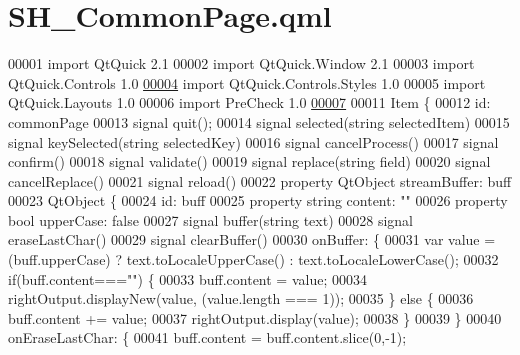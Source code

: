 \hypertarget{SH__CommonPage_8qml}{\section{S\-H\-\_\-\-Common\-Page.\-qml}
\label{SH__CommonPage_8qml}
}

\begin{DoxyCode}
00001 \textcolor{keyword}{import} QtQuick 2.1
00002 import QtQuick.Window 2.1
00003 import QtQuick.Controls 1.0
\hypertarget{SH__CommonPage_8qml_source_l00004}{}\hyperlink{classSH__CommonPage}{00004} import QtQuick.Controls.Styles 1.0
00005 import QtQuick.Layouts 1.0
00006 import PreCheck 1.0
\hypertarget{SH__CommonPage_8qml_source_l00007}{}\hyperlink{classSH__CommonPage_af59ae18e73706e3622c000c2005d9550}{00007} 
00011 Item \{
00012     \textcolor{keywordtype}{id}: commonPage
00013     signal quit();
00014     signal selected(\textcolor{keywordtype}{string} selectedItem)
00015     signal keySelected(\textcolor{keywordtype}{string} selectedKey)
00016     signal cancelProcess()
00017     signal confirm()
00018     signal validate()
00019     signal replace(\textcolor{keywordtype}{string} field)
00020     signal cancelReplace()
00021     signal reload()
00022     \textcolor{keyword}{property} QtObject streamBuffer: buff
00023     QtObject \{
00024         \textcolor{keywordtype}{id}: buff
00025         \textcolor{keyword}{property} \textcolor{keywordtype}{string} content: \textcolor{stringliteral}{""}
00026         \textcolor{keyword}{property} \textcolor{keywordtype}{bool} upperCase: \textcolor{keyword}{false}
00027         signal buffer(\textcolor{keywordtype}{string} text)
00028         signal eraseLastChar()
00029         signal clearBuffer()
00030         onBuffer: \{
00031             var value = (buff.upperCase) ? text.toLocaleUpperCase() : text.toLocaleLowerCase();
00032             \textcolor{keywordflow}{if}(buff.content===\textcolor{stringliteral}{""}) \{
00033                 buff.content = value;
00034                 rightOutput.displayNew(value, (value.length === 1));
00035             \} \textcolor{keywordflow}{else} \{
00036                 buff.content += value;
00037                 rightOutput.display(value);
00038             \}
00039         \}
00040         onEraseLastChar: \{
00041             buff.content = buff.content.slice(0,-1);

\end{DoxyCode}
